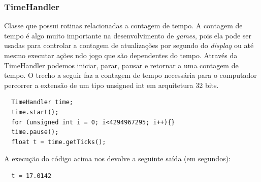 \subsubsection{TimeHandler}
%
%
Classe que possui rotinas relacionadas a contagem de tempo. A contagem de tempo é algo muito importante na desenvolvimento de \textit{games}, pois ela pode ser usadas para controlar a contagem de atualizações por segundo do \textit{display} ou até mesmo executar ações ndo jogo que são dependentes do tempo. Através da TimeHandler podemos iniciar, parar, pausar e retornar a uma contagem de tempo. 
O trecho a seguir faz a contagem de tempo necessária para o computador percorrer a extensão de um tipo unsigned int em arquitetura 32 bits.
%
\begin{lstlisting}
  TimeHandler time;
  time.start();
  for (unsigned int i = 0; i<4294967295; i++){} 
  time.pause();
  float t = time.getTicks();
\end{lstlisting}
%
\par 
A execução do código acima nos devolve a seguinte saída (em segundos): 
%
\begin{lstlisting}
  t = 17.0142
\end{lstlisting}
%
